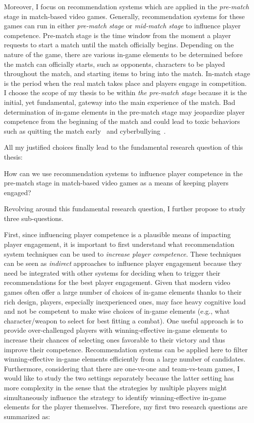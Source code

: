 Moreover, I focus on recommendation systems which are applied in the \textit{pre-match} stage in match-based video games. Generally, recommendation systems for these games can run in either \textit{pre-match stage} or \textit{mid-match stage} to influence player competence. Pre-match stage is the time window from the moment a player requests to start a match until the match officially begins. Depending on the nature of the game, there are various in-game elements to be determined before the match can officially starts, such as opponents, characters to be played throughout the match, and starting items to bring into the match. In-match stage is the period when the real match takes place and players engage in competition. I choose the scope of my thesis to be within \textit{the pre-match stage} because it is the initial, yet fundamental, gateway into the main experience of the match. Bad determination of in-game elements in the pre-match stage may jeopardize player competence from the beginning of the match and could lead to toxic behaviors such as quitting the match early~\cite{shores2014identification} and cyberbullying~\cite{kwak2015exploring}. 

All my justified choices finally lead to the fundamental research question of this thesis:

\begin{displayquote}
How can we use recommendation systems to influence player competence in the pre-match stage in match-based video games as a means of keeping players engaged?
\end{displayquote}

Revolving around this fundamental research question, I further propose to study three sub-questions. 

First, since influencing player competence is a plausible means of impacting player engagement, it is important to first understand what recommendation system techniques can be used to \textit{increase player competence}. These techniques can be seen as \textit{indirect} approaches to influence player engagement because they need be integrated with other systems for deciding when to trigger their recommendations for the best player engagement. Given that modern video games often offer a large number of choices of in-game elements thanks to their rich design, players, especially inexperienced ones, may face heavy cognitive load and not be competent to make wise choices of in-game elements (e.g., what character/weapon to select for best fitting a combat). One useful approach is to provide over-challenged players with winning-effective in-game elements to increase their chances of selecting ones favorable to their victory and thus improve their competence. Recommendation systems can be applied here to filter winning-effective in-game elements efficiently from a large number of candidates. Furthermore, considering that there are one-vs-one and team-vs-team games, I would like to study the two settings separately because the latter setting has more complexity in the sense that the strategies by multiple players might simultaneously influence the strategy to identify winning-effective in-game elements for the player themselves. Therefore, my first two research questions are summarized as: 

